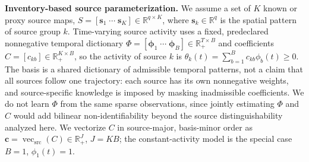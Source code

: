 \noindent\textbf{Inventory-based source parameterization.}
We assume a set of \(K\) known or proxy source maps,
\(S = [\mathbf s_1\;\cdots\;\mathbf s_K]\in \mathbb R^{q\times K}\),
where \(\mathbf s_k\in\mathbb R^q\) is the spatial pattern of source group
\(k\).  Time-varying source activity uses a fixed, predeclared nonnegative
temporal dictionary
\(\Phi=[\boldsymbol\phi_1\;\cdots\;\boldsymbol\phi_B]\in\mathbb R_+^{T\times B}\)
and coefficients \(C=[c_{kb}]\in\mathbb R_+^{K\times B}\), so the activity of
source \(k\) is \(\theta_k(t)=\sum_{b=1}^{B}c_{kb}\phi_b(t)\ge0\).  The basis is a
shared dictionary of admissible temporal patterns, not a claim that all sources
follow one trajectory: each source has its own nonnegative weights, and
source-specific knowledge is imposed by masking inadmissible coefficients.  We do
not learn \(\Phi\) from the same sparse observations, since jointly estimating
\(\Phi\) and \(C\) would add bilinear non-identifiability beyond the source
distinguishability analyzed here.  We vectorize \(C\) in source-major, basis-minor order as
\(\mathbf c=\operatorname{vec}_{\mathrm{src}}(C)\in\mathbb R_+^J\), \(J=KB\); the
constant-activity model is the special case \(B=1\), \(\phi_1(t)=1\).


